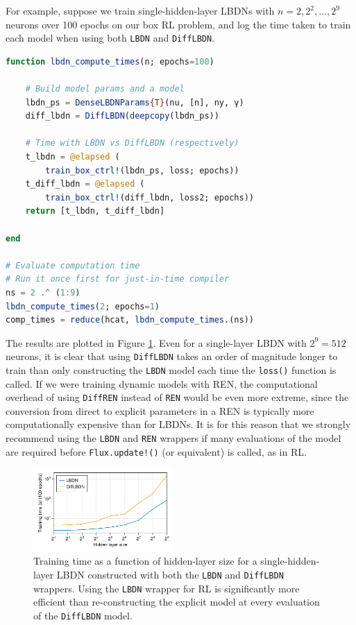 For example, suppose we train single-hidden-layer LBDNs with $n = 2, 2^2, \ldots, 2^9$ neurons over 100 epochs on our box RL problem, and log the time taken to train each model when using both \verb|LBDN| and \verb|DiffLBDN|.

\newpage
\begin{lstlisting}[language = Julia]
function lbdn_compute_times(n; epochs=100)

    # Build model params and a model
    lbdn_ps = DenseLBDNParams{T}(nu, [n], ny, γ)
    diff_lbdn = DiffLBDN(deepcopy(lbdn_ps))

    # Time with LBDN vs DiffLBDN (respectively)
    t_lbdn = @elapsed (
        train_box_ctrl!(lbdn_ps, loss; epochs))
    t_diff_lbdn = @elapsed (
        train_box_ctrl!(diff_lbdn, loss2; epochs))
    return [t_lbdn, t_diff_lbdn]

end

# Evaluate computation time
# Run it once first for just-in-time compiler
ns = 2 .^ (1:9)
lbdn_compute_times(2; epochs=1)
comp_times = reduce(hcat, lbdn_compute_times.(ns))
\end{lstlisting}

The results are plotted in Figure \ref{fig:rl-comptime}. Even for a single-layer LBDN with $2^9 = 512$ neurons, it is clear that using \verb|DiffLBDN| takes an order of magnitude longer to train than only constructing the \verb|LBDN| model each time the \verb|loss()| function is called. If we were training dynamic models with REN, the computational overhead of using \verb|DiffREN| instead of \verb|REN| would be even more extreme, since the conversion from direct to explicit parameters in a REN is typically more computationally expensive than for LBDNs. It is for this reason that we strongly recommend using the \verb|LBDN| and \verb|REN| wrappers if many evaluations of the model are required before \verb|Flux.update!()| (or equivalent) is called, as in RL.

\begin{figure}[ht]
    \centering
    \includegraphics[width=0.47\textwidth]{Images/lbdn_rl_comptime.pdf}
    \caption{Training time as a function of hidden-layer size for a single-hidden-layer LBDN constructed with both the \texttt{LBDN} and \texttt{DiffLBDN} wrappers. Using the \texttt{LBDN} wrapper for RL is significantly more efficient than re-constructing the explicit model at every evaluation of the \texttt{DiffLBDN} model.}
    \label{fig:rl-comptime}
\end{figure}